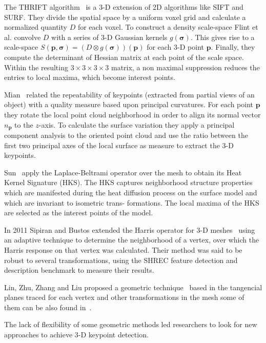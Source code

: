 \documentclass{comjnl}
\begin{document}
The THRIFT algorithm~\cite{THRIFT} is a 3-D extension of 2D algorithms
like SIFT and SURF. They divide the spatial space by a uniform voxel grid
and calculate a normalized quantity $D$ for each voxel. To construct a
density scale-space Flint et al. convolve $D$ with a series of 3-D
Gaussian kernels $g(\bm{\sigma})$. This gives rise to a scale-space
$S(\bm{p},\bm{\sigma}) = (D \otimes g(\bm{\sigma}))(\bm{p})$ for each
3-D point $\bm{p}$. Finally, they compute the determinant of Hessian matrix
at each point of the scale space. Within the resulting $3\times3\times3\times3$
matrix, a non maximal suppression reduces the entries to local maxima, which become
interest points.

Mian~\cite{RepeatabilityAndQuality} related the repeatability of keypoints
(extracted from partial views of an object) with a quality measure based
upon principal curvatures. For each point $\bm{p}$ they rotate
the local point cloud neighborhood in order to align its normal vector $n_{\bm{p}}$
to the $z$-axis. To calculate the surface variation they apply a principal
component analysis to the oriented point cloud and use the ratio between the
first two principal axes of the local surface as measure to extract the 3-D keypoints.

Sun~\cite{Sun01} apply the Laplace-Beltrami operator over
the mesh to obtain its Heat Kernel Signature (HKS). The
HKS captures neighborhood structure properties which
are manifested during the heat diffusion process on the
surface model and which are invariant to isometric trans-
formations. The local maxima of the HKS are selected as
the interest points of the model.

In 2011 Sipiran and Bustos extended the Harris operator for 3-D
meshes~\cite{Sipiran2011} using an adaptive technique to determine the neighborhood
of a vertex, over which the Harris response on that vertex was calculated.
Their method was said to be robust to several transformations, using the SHREC
feature detection and description benchmark to measure their results.

Lin, Zhu, Zhang and Liu proposed a geometric technique~\cite{GMSR} based in the
tangencial planes traced for each vertex and other transformations in the mesh 
some of them can be also found in~\cite{Lin2016}. 

The lack of flexibility of some geometric methods led researchers to look for
new approaches to achieve 3-D keypoint detection.
\end{document}
